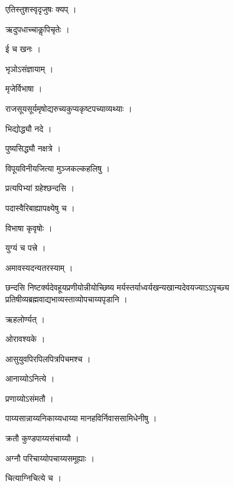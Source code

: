 \documentclass[10pt, openany]{book}
\begin{document}
\noindent एतिस्तुशस्वृदृजुषः क्यप् ।

\noindent ऋदुपधाच्चाकॢपिचृतेः ।

\noindent ई च खनः ।

\noindent भृञोऽसंज्ञायाम् ।

\noindent मृजेर्विभाषा ।

\noindent राजसूयसूर्यमृषोद्यरुच्यकुप्यकृष्टपच्याव्यथ्याः ।

\noindent भिद्योद्ध्यौ नदे ।

\noindent पुष्यसिद्ध्यौ नक्षत्रे ।

\noindent विपूयविनीयजित्या मुञ्जकल्कहलिषु ।

\noindent प्रत्यपिभ्यां ग्रहेश्छन्दसि ।

\noindent पदास्वैरिबाह्यापक्ष्येषु च ।

\noindent विभाषा कृवृषोः ।

\noindent युग्यं च पत्त्रे ।

\noindent अमावस्यदन्यतरस्याम् ।

\noindent छन्दसि निष्टर्क्यदेवहूयप्रणीयोन्नीयोच्छिष्य मर्यस्तर्याध्वर्यखन्यखान्यदेवयज्याऽऽपृच्छ्य प्रतिषीव्यब्रह्मवाद्यभाव्यस्ताव्योपचाय्यपृडानि ।

\noindent ऋहलोर्ण्यत् ।

\noindent ओरावश्यके ।

\noindent आसुयुवपिरपिलपित्रपिचमश्च ।

\noindent आनाय्योऽनित्ये ।

\noindent प्रणाय्योऽसंमतौ ।

\noindent पाय्यसान्नाय्यनिकाय्यधाय्या मानहविर्निवाससामिधेनीषु ।

\noindent क्रतौ कुण्डपाय्यसंचाय्यौ ।

\noindent अग्नौ परिचाय्योपचाय्यसमूह्याः ।

\noindent चित्याग्निचित्ये च ।
\end{document}
